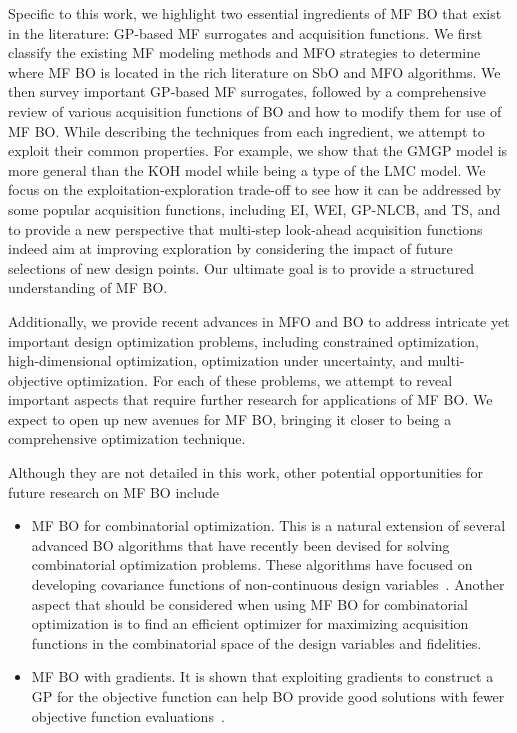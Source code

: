 \documentclass[journal ]{new-aiaa}
\begin{document}
	Specific to this work, we highlight two essential ingredients of MF BO that exist in the literature: GP-based MF surrogates and acquisition functions.
	We first classify the existing MF modeling methods and MFO strategies to determine where MF BO is located in the rich literature on SbO and MFO algorithms.
	We then survey important GP-based MF surrogates, followed by a comprehensive review of various acquisition functions of BO and how to modify them for use of MF BO.  
	While describing the techniques from each ingredient, we attempt to exploit their common properties.
	For example, we show that the GMGP model is more general than the KOH model while being a type of the LMC model.
	We focus on the exploitation-exploration trade-off to see how it can be addressed by some popular acquisition functions, including EI, WEI, GP-NLCB, and TS, and to provide a new perspective that multi-step look-ahead acquisition functions indeed aim at improving exploration by considering the impact of future selections of new design points.  
	Our ultimate goal is to provide a structured understanding of MF BO.
	
	Additionally, we provide recent advances in MFO and BO to address intricate yet important design optimization problems, including constrained optimization, high-dimensional optimization, optimization under uncertainty, and multi-objective optimization.
	For each of these problems, we attempt to reveal important aspects that require further research for applications of MF BO.
	We expect to open up new avenues for MF BO, bringing it closer to being a comprehensive optimization technique.
	
	Although they are not detailed in this work, other potential opportunities for future research on MF BO include    
	\begin{itemize}
		\item MF BO for combinatorial optimization. This is a natural extension of several advanced BO algorithms that have recently been devised for solving combinatorial optimization problems. These algorithms have focused on developing covariance functions of non-continuous design variables~\citep[see e.g.,][]{GomezBombarelli2018,GarridoMerchan2020,ZhangYi2020,Vangelatos2021}. Another aspect that should be considered when using MF BO for combinatorial optimization is to find an efficient optimizer for maximizing acquisition functions in the combinatorial space of the design variables and fidelities.
		
		\item MF BO with gradients. It is shown that exploiting gradients to construct a GP for the objective function can help BO provide good solutions with fewer objective function evaluations~\citep{WuJ2017}.
	\end{itemize}
	
\end{document}
